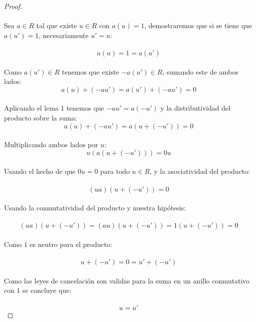 \documentclass[11pt,letterpaper]{article}
\begin{document}
\begin{proof}\,\\
    \,\\
    Sea $a\in R$ tal que existe $u\in R$ con $a(u)=1$, demostraremos que si se tiene que $a(u')=1$, necesariamente $u'=u$:\,\\
    \,\\
    \begin{equation*}
        a(u)=1=a(u')
    \end{equation*}\,\\
    Como $a(u')\in R$ tenemos que existe $-a(u')\in R$, sumando este de ambos lados:\,\\
    \begin{equation*}
        a(u)+(-au')=a(u')+(-au')=0
    \end{equation*}\,\\
    Aplicando el lema 1 tenemos que $-au'=a(-u')$ y la distributividad del producto sobre la suma:\,\\
    \begin{equation*}
        a(u)+(-au')=a(u+(-u'))=0
    \end{equation*}\,\\
    Multiplicando ambos lados por $u$:\,\\
    \begin{equation*}
        u(a(u+(-u')))=0u
    \end{equation*}\,\\
    Usando el hecho de que $0u=0$ para todo $u\in R$, y la asociatividad del producto:\,\\
    \,\\
    \begin{equation*}
        (ua)(u+(-u'))=0
    \end{equation*}\,\\
    Usando la conmutatividad del producto y nuestra hip\'otesis:\,\\
    \,\\
    \begin{equation*}
        (ua)(u+(-u'))=(au)(u+(-u'))=1(u+(-u'))=0
    \end{equation*}\,\\
    Como $1$ es neutro para el producto:\,\\
    \,\\
    \begin{equation*}
        u+(-u')=0=u'+(-u')
    \end{equation*}\,\\
    Como las leyes de cancelaci\'on son validas para la suma en un anillo conmutativo con $1$ se concluye que:\,\\
    \,\\
    \begin{equation*}
        u=u'
    \end{equation*}
\end{proof}\,\\
\end{document}
